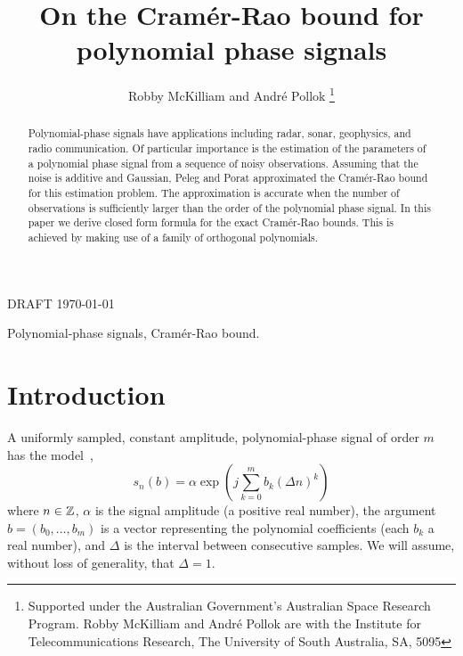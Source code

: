 \documentclass[journal,10pt]{IEEEtran}
\begin{document}
\title{On the Cram\'{e}r-Rao bound for polynomial phase signals}

\author{Robby McKilliam and Andr\'{e} Pollok%
\thanks{Supported under the Australian Government's Australian Space Research Program.
Robby McKilliam and Andr\'{e} Pollok are with the Institute for Telecommunications Research, The University of South Australia, SA, 5095}
}
%
{DRAFT \today}



\maketitle


\begin{abstract}
Polynomial-phase signals have applications including radar, sonar, geophysics, and radio communication.  Of particular importance is the estimation of the parameters of a polynomial phase signal from a sequence of noisy observations.  Assuming that the noise is additive and Gaussian,  Peleg and Porat approximated the Cram\'{e}r-Rao bound for this estimation problem.  The approximation is accurate when the number of observations is sufficiently larger than the order of the polynomial phase signal.  In this paper we derive closed form formula for the exact Cram\'{e}r-Rao bounds.  This is achieved by making use of a family of orthogonal polynomials.
\end{abstract}

\begin{IEEEkeywords}
Polynomial-phase signals, Cram\'{e}r-Rao bound.
\end{IEEEkeywords}



\section{Introduction}

A uniformly sampled, constant amplitude, polynomial-phase signal of order $m$ has the model~\cite{Peleg_DPT_1995, Peleg1991_CRB_PPS_1991, Peleg1991_est_class_PPS_1991, Rihaczek1996},
\[
s_n(b) = \alpha \exp\left( j \sum_{k = 0}^{m}{b_k (\Delta n)^k}\right)
\]
where $n \in {\mathbb Z}$, $\alpha$ is the signal amplitude (a positive real number), the argument $b=(b_0, \dots, b_m)$ is a vector representing the polynomial coefficients (each $b_k$ a real number),  and $\Delta$ is the interval between consecutive samples.  We will assume, without loss of generality, that $\Delta = 1$.
\end{document}
